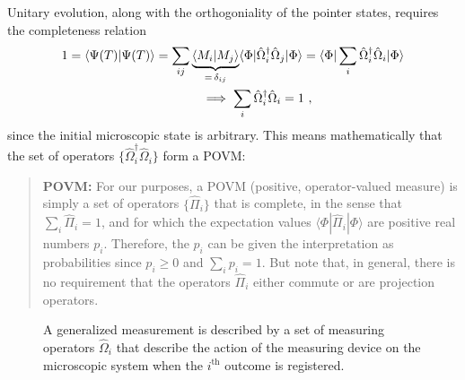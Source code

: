 \documentclass[12pt]{article}
\theoremstyle{plain}
\theoremstyle{definition}
\theoremstyle{remark}
\def\bra#1{\langle #1|}
\def\ket#1{| #1\rangle}
\begin{document}
Unitary evolution, along with the orthogoniality of the pointer states, requires the completeness relation
\begin{multline}
1=\bra{\Psi(T)}\Psi(T)\rangle=\sum_{ij}\underbrace{\bra{M_i}M_j\rangle}_{=\,\delta_{ij}}\bra{\Phi}\hat \Omega_i^\dagger\hat \Omega_j\ket{\Phi}
=\bra{\Phi}\sum_i\hat \Omega_i^\dagger\hat \Omega_i\ket{\Phi}\\
\hbox to .5in{\qquad}\implies \sum_i\hat\Omega_i^\dagger\hat\Omega_i=1\ ,
\label{com}
\end{multline}
since the initial microscopic state is arbitrary.
This means mathematically that the set of operators $\{\hat\Omega_i^\dagger\hat\Omega_i\}$ form a POVM: 
\begin{quote}{\bf POVM:} For our purposes, a POVM (positive, operator-valued measure) is simply a set of operators $\{\hat\Pi_i\}$ that is complete, in the sense that $\sum_i\hat\Pi_i=1$, and for which the expectation values $\bra{\Phi}\hat\Pi_i\ket{\Phi}$ are positive real numbers $p_i$. Therefore, the $p_i$ can be given the interpretation as probabilities since $p_i\geq0$ and $\sum_ip_i=1$. But note that, in general, there is no requirement that the operators $\hat\Pi_i$ either commute or are projection operators.
\end{quote}
\begin{figure}[ht]
\begin{center}
\end{center}
\caption{A generalized measurement is described by a set of measuring operators $\hat\Omega_i$ that describe the action of the measuring device on the microscopic system when the $i^\text{th}$ outcome is registered.}
\label{f2}
\end{figure}
\end{document}
